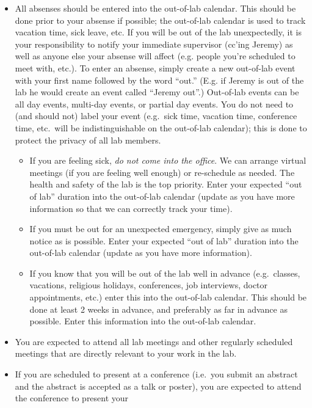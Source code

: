 \documentclass{tufte-book} %
\begin{document}
\begin{itemize}
\item All absenses should be entered into the out-of-lab calendar.
  This should be done prior to your absense if possible; the
  out-of-lab calendar is used to track vacation time, sick leave, etc.
  If you will be out of the lab unexpectedly, it is your
  responsibility to notify your immediate supervisor (cc'ing Jeremy)
  as well as anyone else your absense will affect (e.g. people you're
  scheduled to meet with, etc.).  To enter an absense, simply create a
  new out-of-lab event with your first name followed by the word
  ``out.''  (E.g. if Jeremy is out of the lab he would create an event
  called ``Jeremy out''.)  Out-of-lab events can be all day events,
  multi-day events, or partial day events.  You do not need to (and
  should not) label your event (e.g.\ sick time, vacation time,
  conference time, etc.\ will be indistinguishable on the out-of-lab
  calendar); this is done to protect the privacy of all lab members.
\begin{itemize}
\item If you are feeling sick, \textit{do not come into the office}.  We can
  arrange virtual meetings (if you are feeling well enough) or
  re-schedule as needed.  The health and safety of the lab is the top
  priority.  Enter your expected ``out of lab'' duration into the
  out-of-lab calendar (update as you have more information so that we
  can correctly track your time).
\item If you must be out for an unexpected emergency, simply give as
  much notice as is possible.  Enter your expected ``out of lab''
  duration into the out-of-lab calendar (update as you have more
  information).
\item If you know that you will be out of the lab well in advance
  (e.g.\ classes, vacations, religious holidays, conferences, job interviews,
  doctor appointments, etc.) enter this into the out-of-lab calendar.  This should be done
  at least 2 weeks in advance, and preferably as far in advance as
  possible.  Enter this information into the out-of-lab calendar.
\end{itemize}
\item You are expected to attend all lab meetings and other regularly
  scheduled meetings that are directly relevant to your work in the
  lab.
\item If you are scheduled to present at a conference (i.e.\ you
  submit an abstract and the abstract is accepted as a talk or
  poster), you are expected to attend the conference to present your

\end{itemize}
\end{document}
